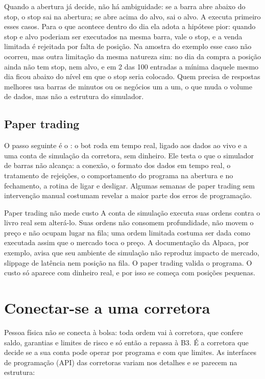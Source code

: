 Quando a abertura já decide, não há ambiguidade: se a barra abre abaixo do stop, o stop sai na abertura; se abre acima do alvo, sai o alvo. A  executa primeiro esses casos. Para o que acontece dentro do dia ela adota a hipótese pior: quando stop e alvo poderiam ser executados na mesma barra, vale o stop, e a venda limitada é rejeitada por falta de posição. Na amostra do exemplo esse caso não ocorreu, mas outra limitação da mesma natureza sim: no dia da compra a posição ainda não tem stop, nem alvo, e em 2 das 100 entradas a mínima daquele mesmo dia ficou abaixo do nível em que o stop seria colocado. Quem precisa de respostas melhores usa barras de minutos ou os negócios um a um, o que muda o volume de dados, mas não a estrutura do simulador.

\subsection{Paper trading}

O passo seguinte é o : o bot roda em tempo real, ligado aos dados ao vivo e a uma conta de simulação da corretora, sem dinheiro. Ele testa o que o simulador de barras não alcança: a conexão, o formato dos dados em tempo real, o tratamento de rejeições, o comportamento do programa na abertura e no fechamento, a rotina de ligar e desligar. Algumas semanas de paper trading sem intervenção manual costumam revelar a maior parte dos erros de programação.

\begin{armadilha}{Paper trading não mede custo}
A conta de simulação executa suas ordens contra o livro real sem alterá-lo. Suas ordens não consomem profundidade, não movem o preço e não ocupam lugar na fila; uma ordem limitada costuma ser dada como executada assim que o mercado toca o preço. A documentação da Alpaca, por exemplo, avisa que seu ambiente de simulação não reproduz impacto de mercado, slippage de latência nem posição na fila. O paper trading valida o programa. O custo só aparece com dinheiro real, e por isso se começa com posições pequenas.
\end{armadilha}

\section{Conectar-se a uma corretora}

Pessoa física não se conecta à bolsa: toda ordem vai à corretora, que confere saldo, garantias e limites de risco e só então a repassa à B3. É a corretora que decide se a sua conta pode operar por programa e com que limites. As interfaces de programação (API) das corretoras variam nos detalhes e se parecem na estrutura:

